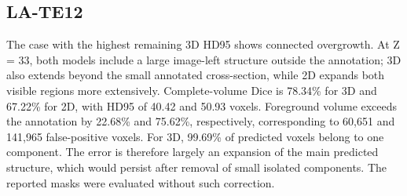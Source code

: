 \documentclass[11pt,a4paper]{article}
\begin{document}
\subsection*{LA-TE12}

The case with the highest remaining 3D HD95 shows connected overgrowth. At Z = 33, both models include a large image-left structure outside the annotation; 3D also extends beyond the small annotated cross-section, while 2D expands both visible regions more extensively. Complete-volume Dice is 78.34\% for 3D and 67.22\% for 2D, with HD95 of 40.42 and 50.93 voxels. Foreground volume exceeds the annotation by 22.68\% and 75.62\%, respectively, corresponding to 60,651 and 141,965 false-positive voxels. For 3D, 99.69\% of predicted voxels belong to one component. The error is therefore largely an expansion of the main predicted structure, which would persist after removal of small isolated components. The reported masks were evaluated without such correction.
\end{document}
